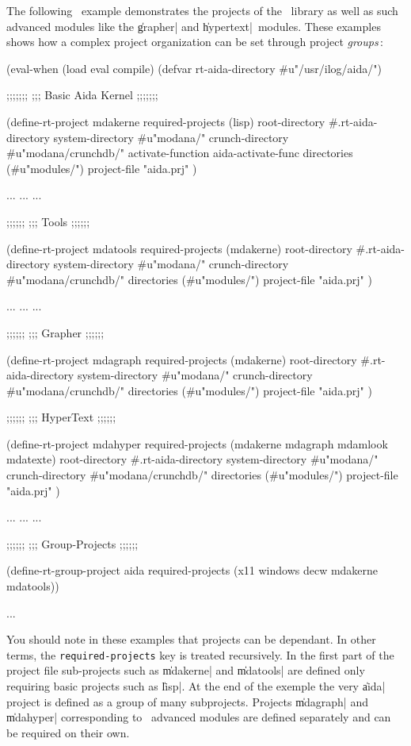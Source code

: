 The following \Aida\ example demonstrates the projects of the \Aida\ 
library as well as such advanced modules like
the \|grapher| and \|hypertext|\ modules. 
These examples shows how a complex project organization can be set
through project {\em groups}\,:

\begin{Longcode*}
(eval-when (load eval compile)
   (defvar rt-aida-directory #u"/usr/ilog/aida/")

;;;;;;;
;;; Basic Aida Kernel
;;;;;;;

(define-rt-project mdakerne
  required-projects (lisp)
  root-directory #.rt-aida-directory
  system-directory #u"modana/"
  crunch-directory #u"modana/crunchdb/"
  activate-function aida-activate-func
  directories (#u"modules/")
  project-file "aida.prj"
  )

...
...
...

;;;;;;
;;; Tools
;;;;;;

(define-rt-project mdatools
  required-projects (mdakerne)
  root-directory #.rt-aida-directory
  system-directory #u"modana/"
  crunch-directory #u"modana/crunchdb/"
  directories (#u"modules/")
  project-file "aida.prj"
  )

...
...
...

;;;;;;
;;; Grapher
;;;;;;

(define-rt-project mdagraph
  required-projects (mdakerne)
  root-directory #.rt-aida-directory
  system-directory #u"modana/"
  crunch-directory #u"modana/crunchdb/"
  directories (#u"modules/")
  project-file "aida.prj"
  )


;;;;;;
;;; HyperText
;;;;;;

(define-rt-project mdahyper
  required-projects (mdakerne mdagraph mdamlook mdatexte)
  root-directory #.rt-aida-directory
  system-directory #u"modana/"
  crunch-directory #u"modana/crunchdb/"
  directories (#u"modules/")
  project-file "aida.prj"
  )

...
...
...

;;;;;;
;;; Group-Projects
;;;;;;

(define-rt-group-project aida
  required-projects (x11 windows decw mdakerne mdatools))

...
\end{Longcode*}

You should note in these examples that projects can be dependant.  
In other terms, the {\tt required-projects} key is treated
recursively.
In the first part of the project file sub-projects such as
\|mdakerne| and \|mdatools| are defined only requiring basic
projects such as \|lisp|. At the end of the exemple the very \|aida|
project is defined as a group of many subprojects.
Projects \|mdagraph| and \|mdahyper| corresponding to \Aida\
advanced modules are defined separately and can be required
on their own.


